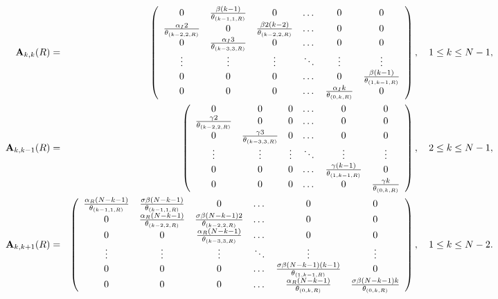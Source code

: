 \documentclass[preprint,12pt]{elsarticle}
\begin{document}
{\scriptsize
\begin{eqnarray*}
 {\bf A}_{k,k}(R) &=& \left(\begin{array}{cccccc}
0 & \frac{\beta(k-1)}{\theta_{(k-1,1,R)}} & 0 & \dots & 0 & 0\\
\frac{\alpha_I2}{\theta_{(k-2,2,R)}} & 0 & \frac{\beta2(k-2)}{\theta_{(k-2,2,R)}} & \dots & 0 & 0\\
0 & \frac{\alpha_I3}{\theta_{(k-3,3,R)}} & 0 & \dots & 0 & 0\\
\vdots & \vdots & \vdots & \ddots & \vdots & \vdots\\
0 & 0 & 0 & \dots & 0 & \frac{\beta(k-1)}{\theta_{(1,k-1,R)}}\\
0 & 0 & 0 & \dots & \frac{\alpha_Ik}{\theta_{(0,k,R)}} & 0
                        \end{array}\right),\quad 1\leq k\leq N-1,\\
 {\bf A}_{k,k-1}(R) &=& \left(\begin{array}{cccccc}
0 & 0 & 0 & \dots & 0 & 0\\
\frac{\gamma2}{\theta_{(k-2,2,R)}} & 0 & 0 & \dots & 0 & 0\\
0 & \frac{\gamma3}{\theta_{(k-3,3,R)}} & 0 & \dots & 0 & 0\\
\vdots & \vdots & \vdots & \ddots & \vdots & \vdots\\
0 & 0 & 0 & \dots & \frac{\gamma(k-1)}{\theta_{(1,k-1,R)}} & 0\\
0 & 0 & 0 & \dots & 0 & \frac{\gamma k}{\theta_{(0,k,R)}}
                        \end{array}\right),\quad 2\leq k\leq N-1,\\
{\bf A}_{k,k+1}(R) &=& \left(\begin{array}{cccccc}
\frac{\alpha_R(N-k-1)}{\theta_{(k-1,1,R)}} & \frac{\sigma\beta(N-k-1)}{\theta_{(k-1,1,R)}} & 0 & \dots & 0 & 0\\
0 & \frac{\alpha_R(N-k-1)}{\theta_{(k-2,2,R)}} & \frac{\sigma\beta(N-k-1)2}{\theta_{(k-2,2,R)}} & \dots & 0 & 0\\
0 & 0 & \frac{\alpha_R(N-k-1)}{\theta_{(k-3,3,R)}} & \dots & 0 & 0\\
\vdots & \vdots & \vdots & \ddots & \vdots & \vdots\\
0 & 0 & 0 & \dots & \frac{\sigma\beta(N-k-1)(k-1)}{\theta_{(1,k-1,R)}} & 0\\
0 & 0 & 0 & \dots & \frac{\alpha_R(N-k-1)}{\theta_{(0,k,R)}} & \frac{\sigma\beta(N-k-1)k}{\theta_{(0,k,R)}}
                        \end{array}\right),\quad 1\leq k\leq N-2.
\end{eqnarray*}}
\end{document}
